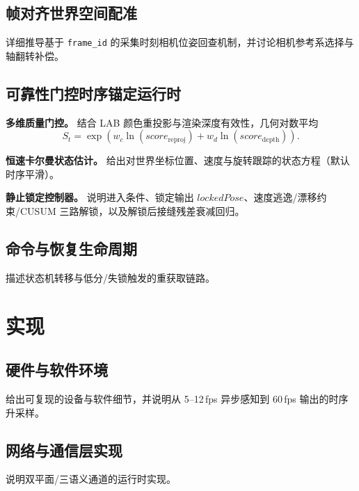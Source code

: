 \documentclass[review]{vgtc}
\begin{document}
\subsection{帧对齐世界空间配准}
详细推导基于 \texttt{frame\_id} 的采集时刻相机位姿回查机制，并讨论相机参考系选择与轴翻转补偿。

\subsection{可靠性门控时序锚定运行时}
\noindent\textbf{多维质量门控。} 结合 LAB 颜色重投影与渲染深度有效性，几何对数平均
\begin{equation}
  S_t = \exp\!\left(w_c\ln(\mathit{score}_{\text{reproj}}) + w_d\ln(\mathit{score}_{\text{depth}})\right).
\end{equation}

\noindent\textbf{恒速卡尔曼状态估计。} 给出对世界坐标位置、速度与旋转跟踪的状态方程（默认时序平滑）。

\noindent\textbf{静止锁定控制器。} 说明进入条件、锁定输出 $\mathit{lockedPose}$、速度逃逸/漂移约束/CUSUM 三路解锁，以及解锁后接缝残差衰减回归。

\subsection{命令与恢复生命周期}
描述状态机转移与低分/失锁触发的重获取链路。

\section{实现}

\subsection{硬件与软件环境}
给出可复现的设备与软件细节，并说明从 5--12\,fps 异步感知到 60\,fps 输出的时序升采样。

\subsection{网络与通信层实现}
说明双平面/三语义通道的运行时实现。
\end{document}

